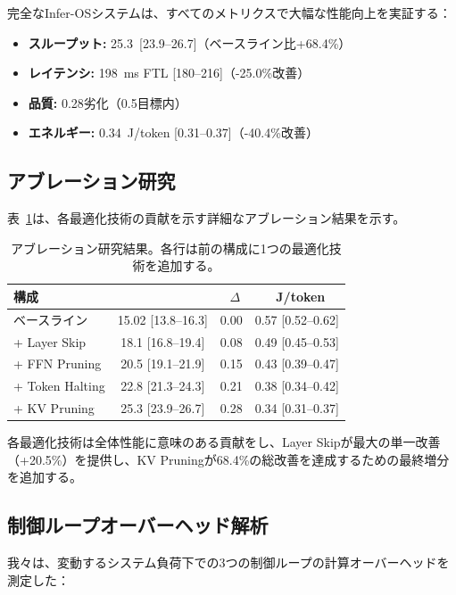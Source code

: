 \documentclass[10pt,twocolumn,a4paper]{jarticle}
\newcommand{\tps}{\text{tok/s}}
\newcommand{\ppl}{\mathrm{PPL}}
\begin{document}
完全なInfer-OSシステムは、すべてのメトリクスで大幅な性能向上を実証する：

\begin{itemize}
\item \textbf{スループット:} \SI{25.3}{\tps}\ [23.9--26.7]（ベースライン比+68.4\%）
\item \textbf{レイテンシ:} \SI{198}{ms} FTL [180--216]（-25.0\%改善）
\item \textbf{品質:} \SI{0.28}{\ppl}劣化（\SI{0.5}{\ppl}目標内）
\item \textbf{エネルギー:} \SI{0.34}{J/token} [0.31--0.37]（-40.4\%改善）
\end{itemize}

\subsection{アブレーション研究}

表~\ref{tab:ablation}は、各最適化技術の貢献を示す詳細なアブレーション結果を示す。

\begin{table}[t]
\centering
\small
\caption{アブレーション研究結果。各行は前の構成に1つの最適化技術を追加する。}
\label{tab:ablation}
\begin{tabular}{@{}lccc@{}}
\toprule
\textbf{構成} & \textbf{\tps} & \textbf{\ppl\ $\Delta$} & \textbf{\SI{}{J/token}} \\
\midrule
ベースライン & 15.02 [13.8--16.3] & 0.00 & 0.57 [0.52--0.62] \\
+ Layer Skip & 18.1 [16.8--19.4] & 0.08 & 0.49 [0.45--0.53] \\
+ FFN Pruning & 20.5 [19.1--21.9] & 0.15 & 0.43 [0.39--0.47] \\
+ Token Halting & 22.8 [21.3--24.3] & 0.21 & 0.38 [0.34--0.42] \\
+ KV Pruning & 25.3 [23.9--26.7] & 0.28 & 0.34 [0.31--0.37] \\
\bottomrule
\end{tabular}
\end{table}

各最適化技術は全体性能に意味のある貢献をし、Layer Skipが最大の単一改善（+20.5\%）を提供し、KV Pruningが68.4\%の総改善を達成するための最終増分を追加する。

\subsection{制御ループオーバーヘッド解析}

我々は、変動するシステム負荷下での3つの制御ループの計算オーバーヘッドを測定した：
\end{document}
